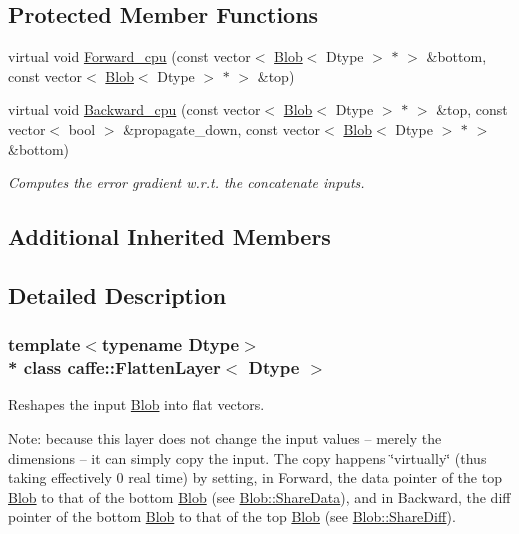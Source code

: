 \subsection*{Protected Member Functions}
\begin{DoxyCompactItemize}
\item 
virtual void \hyperlink{classcaffe_1_1FlattenLayer_a0ecfcc1e1d32ea5ed57ea32f6985d902}{Forward\+\_\+cpu} (const vector$<$ \hyperlink{classcaffe_1_1Blob}{Blob}$<$ Dtype $>$ $\ast$ $>$ \&bottom, const vector$<$ \hyperlink{classcaffe_1_1Blob}{Blob}$<$ Dtype $>$ $\ast$ $>$ \&top)
\item 
virtual void \hyperlink{classcaffe_1_1FlattenLayer_ad207771acf8b2ab912f6daf0c4a6dfe8}{Backward\+\_\+cpu} (const vector$<$ \hyperlink{classcaffe_1_1Blob}{Blob}$<$ Dtype $>$ $\ast$ $>$ \&top, const vector$<$ bool $>$ \&propagate\+\_\+down, const vector$<$ \hyperlink{classcaffe_1_1Blob}{Blob}$<$ Dtype $>$ $\ast$ $>$ \&bottom)
\begin{DoxyCompactList}\small\item\em Computes the error gradient w.\+r.\+t. the concatenate inputs. \end{DoxyCompactList}\end{DoxyCompactItemize}
\subsection*{Additional Inherited Members}


\subsection{Detailed Description}
\subsubsection*{template$<$typename Dtype$>$\\*
class caffe\+::\+Flatten\+Layer$<$ Dtype $>$}

Reshapes the input \hyperlink{classcaffe_1_1Blob}{Blob} into flat vectors. 

Note\+: because this layer does not change the input values -- merely the dimensions -- it can simply copy the input. The copy happens \char`\"{}virtually\char`\"{} (thus taking effectively 0 real time) by setting, in Forward, the data pointer of the top \hyperlink{classcaffe_1_1Blob}{Blob} to that of the bottom \hyperlink{classcaffe_1_1Blob}{Blob} (see \hyperlink{classcaffe_1_1Blob_a8fce5a816a2b9629686db69108610d93}{Blob\+::\+Share\+Data}), and in Backward, the diff pointer of the bottom \hyperlink{classcaffe_1_1Blob}{Blob} to that of the top \hyperlink{classcaffe_1_1Blob}{Blob} (see \hyperlink{classcaffe_1_1Blob_a004781965b09f94c409cec9a6fc7c35c}{Blob\+::\+Share\+Diff}). 


